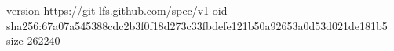 version https://git-lfs.github.com/spec/v1
oid sha256:67a07a545388cdc2b3f0f18d273c33fbdefe121b50a92653a0d53d021de181b5
size 262240
